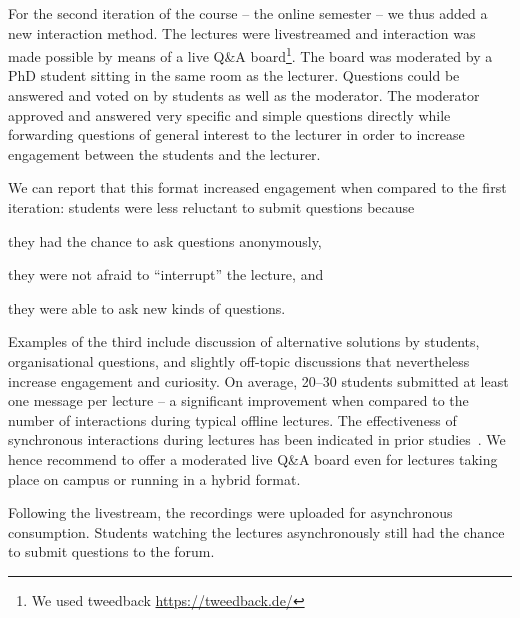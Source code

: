 For the second iteration of the course -- the online semester --
we thus added a new interaction method.
The lectures were livestreamed and
interaction was made possible by means of a live Q\&A board\footnote{We used tweedback \url{https://tweedback.de/}}.
The board was moderated by a PhD student
sitting in the same room as the lecturer.
Questions could be answered and voted on by students as well as the moderator.
The moderator approved and answered very specific and simple questions directly while forwarding questions of general interest to the lecturer in order to increase engagement between the students and the lecturer.

We can report that this format increased engagement when compared to the first iteration:
students were less reluctant to submit questions because
\begin{enumerate*}[label=\arabic*)]
  \item they had the chance to ask questions anonymously,
  \item they were not afraid to ``interrupt'' the lecture, and
  \item they were able to ask new kinds of questions.
\end{enumerate*}
Examples of the third include discussion of alternative solutions by students,
organisational questions,
and slightly off-topic discussions that nevertheless increase engagement and curiosity.
On average, 20--30 students
submitted at least one message per lecture -- a significant improvement when compared to the number of interactions during typical offline lectures.
The effectiveness of synchronous interactions during lectures has been indicated in prior studies~\cite{onlineengagement3,onlineengagement1}.
We hence recommend to offer a moderated live Q\&A board even for lectures taking place on campus or running in a hybrid format.

Following the livestream,
the recordings were uploaded for asynchronous consumption.
Students watching the lectures asynchronously still had the chance to submit questions to the forum.

